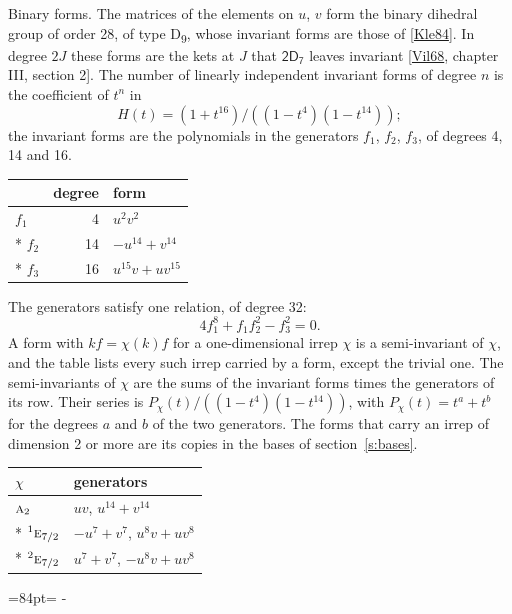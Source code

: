 \documentclass[10pt,a4paper]{article}
\makeatletter
\renewcommand\paragraph{\@startsection{paragraph}{4}{\z@}{1.5ex plus .5ex minus .2ex}{-1em}%
  {\normalfont\small\sffamily\bfseries\color{parttitle}}}
\newcommand{\needspace}[1]{\par\penalty-100\begingroup\dimen0=#1\relax\dimen2=\pagegoal
  \advance\dimen2-\pagetotal\ifdim\dimen0>\dimen2\relax\ifdim\dimen2>0pt\vfil\break\fi\fi
  \endgroup}
\numberwithin{equation}{section}
\newcommand{\grp}[1]{\mathsf{#1}}
\newcommand{\irr}[1]{\text{\normalfont\scshape #1}}
\newcommand{\conjpair}[1]{{}^{#1}}
\makeatother
\begin{document}
\paragraph{Binary forms.}
The matrices of the elements on $u$, $v$ form the binary dihedral group of order 28, of type D\textsubscript{9}, whose invariant forms are those of [\href{../../../REFERENCES.pdf\#ref.Kle84}{Kle84}]. In degree $2J$ these forms are the kets at $J$ that $\grp{2D_{7}}$ leaves invariant [\href{../../../REFERENCES.pdf\#ref.Vil68}{Vil68}, chapter III, section 2]. \label{n:head.degree}\label{n:head.form}The number of linearly independent invariant forms of degree $n$ is the coefficient of $t^n$ in
\begin{equation}\label{e:molien}H(t) = (1 + t^{16})/((1-t^{4})(1-t^{14}));\end{equation}
the invariant forms are the polynomials in the generators $f_1$, $f_2$, $f_3$, of degrees 4, 14 and 16.
{\small\begin{longtable}{@{}lrl@{}}\toprule
& degree & form\\\midrule\endhead
\bottomrule\endfoot\endlastfoot
$f_{1}$ & 4 & $u^{2}v^{2}$\\*
$f_{2}$ & 14 & $-u^{14} + v^{14}$\\*
$f_{3}$ & 16 & $u^{15}v + uv^{15}$\\
\bottomrule\end{longtable}}
The generators satisfy one relation, of degree 32:
\begin{equation}\label{e:relation}4f_{1}^{8} + f_{1}f_{2}^{2} - f_{3}^{2} = 0.\end{equation}
A form with $k f = \chi(k) f$ for a one-dimensional irrep $\chi$ is a semi-invariant of $\chi$, and the table lists every such irrep carried by a form, except the trivial one. \label{n:head.generators}The semi-invariants of $\chi$ are the sums of the invariant forms times the generators of its row. Their series is $P_\chi(t)/((1-t^{4})(1-t^{14}))$, with $P_\chi(t) = t^{a} + t^{b}$ for the degrees $a$ and $b$ of the two generators. The forms that carry an irrep of dimension 2 or more are its copies in the bases of section~\ref{s:bases}.
{\small\begin{longtable}{@{}ll@{}}\toprule
$\chi$ & generators\\\midrule\endhead
\bottomrule\endfoot\endlastfoot
$\irr{a}_{2}$ & $uv$, $u^{14} + v^{14}$\\*
$\conjpair{1}\irr{e}_{7/2}$ & $-u^{7} + v^{7}$, $u^{8}v + uv^{8}$\\*
$\conjpair{2}\irr{e}_{7/2}$ & $u^{7} + v^{7}$, $-u^{8}v + uv^{8}$\\
\bottomrule\end{longtable}}
\needspace{84pt}
\end{document}
